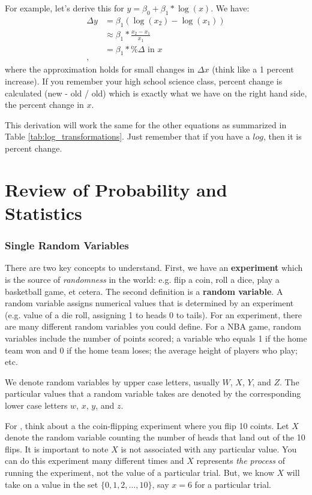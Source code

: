 \documentclass[12pt]{article}
\begin{document}
For example, let's derive this for $y = \beta_0 + \beta_1 * \log(x)$. We have:
\begin{align*}
  \Delta y &= \beta_1 \left( \log(x_2) - \log(x_1) \right) \\
  &\approx \beta_1 * \frac{x_2 - x_1}{x_1} \\
  &= \beta_1 * \% \Delta \text{ in } x \\, 
\end{align*}
where the approximation holds for small changes in $\Delta x$ (think like a 1 percent increase). If you remember your high school science class, percent change is calculated (new - old / old) which is exactly what we have on the right hand side, the percent change in $x$. 

This derivation will work the same for the other equations as summarized in Table \ref{tab:log_transformations}. Just remember that if you have a $log$, then it is percent change.



\part{Review of Probability and Statistics}

\section{Single Random Variables}

There are two key concepts to understand. First, we have an \textbf{experiment} which is the source of \emph{randomness} in the world: e.g. flip a coin, roll a dice, play a basketball game, et cetera. The second definition is a \textbf{random variable}. A random variable assigns numerical values that is determined by an experiment (e.g. value of a die roll, assigning 1 to heads 0 to tails). For an experiment, there are many different random variables you could define. For a NBA game, random variables include the number of points scored; a variable who equals 1 if the home team won and 0 if the home team loses; the average height of players who play; etc. 

We denote random variables by upper case letters, usually $W$, $X$, $Y$,
and $Z$. The particular values that a random variable takes are denoted by the corresponding lower case letters $w$, $x$, $y$, and $z$.

For , think about a the coin-flipping experiment where you flip 10 coints. Let $X$ denote the random variable counting the number of heads that land out of the 10 flips. It is important to note $X$ is not associated with any particular value. You can do this experiment many different times and $X$ represents \emph{the process} of running the experiment, not the value of a particular trial. But, we know $X$ will take on a value in the set $\{ 0, 1, 2, \dots, 10 \}$, say $x = 6$ for a particular trial.
\end{document}

